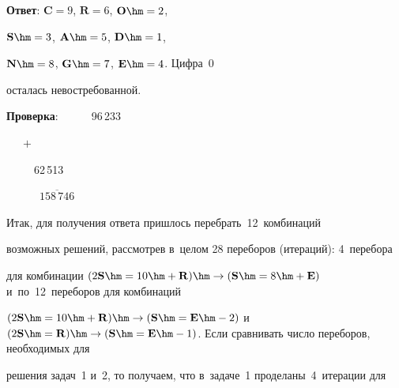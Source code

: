  


 \noindent


 \textbf{Ответ}: $\mathbf{C} = 9$, $\mathbf{R} = 6$, $\mathbf{O}\hm = 2$, 


$\mathbf{S}\hm = 3$, $\mathbf{A}\hm = 5$, $\mathbf{D}\hm = 1$, 


$\mathbf{N}\hm = 8$, $\mathbf{G}\hm = 7$, $\mathbf{E}\hm = 4$. Цифра~0 


осталась невостребованной. 





\pagebreak


 


 \noindent


 \textbf{Проверка}:\ \ \ \ \ \ 96\,233\\[-19pt]


 


\noindent 


 \ \ \ $+$\\[-19pt]


               


               \noindent


              \ \ \ \ \ 62\,513


               


               \noindent


             \ \ \ \ \ \ $\overline{158\,746}$


    


    Итак, для получения ответа пришлось перебрать~12~комбинаций 


возможных решений, рассмотрев в~целом 28 переборов (итераций): 4~перебора 


для комбинации $(2\mathbf{S}\hm = 10 \hm+ \mathbf{R}) \hm\to 


(\mathbf{S}\hm = 8 \hm+ \mathbf{E})$ и~по~12~переборов для комбинаций 


$(2\mathbf{S}\hm = 10 \hm+ \mathbf{R}) \hm\to  (\mathbf{S}\hm = 


\mathbf{E}\hm- 2)$ и~$(2\mathbf{S}\hm = \mathbf{R}) \hm\to (\mathbf{S}\hm = 


\mathbf{E}\hm- 1)$. Если сравнивать число переборов, необходимых для 


решения задач~1 и~2, то получаем, что в~задаче~1 проделаны~4~итерации для 


